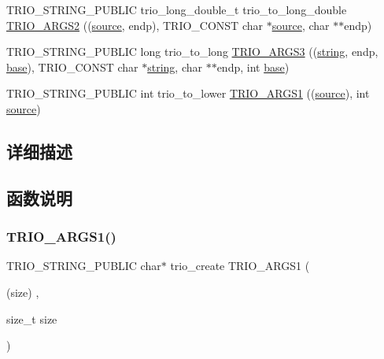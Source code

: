 \begin{DoxyCompactItemize}
\item 
T\+R\+I\+O\+\_\+\+S\+T\+R\+I\+N\+G\+\_\+\+P\+U\+B\+L\+IC trio\+\_\+long\+\_\+double\+\_\+t trio\+\_\+to\+\_\+long\+\_\+double \hyperlink{group___static_strings_gaed92d5fa148b528a8b3c0e37c7b8a64f}{T\+R\+I\+O\+\_\+\+A\+R\+G\+S2} ((\hyperlink{structsource}{source}, endp), T\+R\+I\+O\+\_\+\+C\+O\+N\+ST char $\ast$\hyperlink{structsource}{source}, char $\ast$$\ast$endp)
\item 
T\+R\+I\+O\+\_\+\+S\+T\+R\+I\+N\+G\+\_\+\+P\+U\+B\+L\+IC long trio\+\_\+to\+\_\+long \hyperlink{group___static_strings_ga864214bc85a084895ab27ef877035b84}{T\+R\+I\+O\+\_\+\+A\+R\+G\+S3} ((\hyperlink{structstring}{string}, endp, \hyperlink{structbase}{base}), T\+R\+I\+O\+\_\+\+C\+O\+N\+ST char $\ast$\hyperlink{structstring}{string}, char $\ast$$\ast$endp, int \hyperlink{structbase}{base})
\item 
T\+R\+I\+O\+\_\+\+S\+T\+R\+I\+N\+G\+\_\+\+P\+U\+B\+L\+IC int trio\+\_\+to\+\_\+lower \hyperlink{group___static_strings_ga8a0423dd551b1dd36ef8ebd78b264d7e}{T\+R\+I\+O\+\_\+\+A\+R\+G\+S1} ((\hyperlink{structsource}{source}), int \hyperlink{structsource}{source})
\end{DoxyCompactItemize}


\subsection{详细描述}


\subsection{函数说明}
\mbox{\label{group___static_strings_ga8ce1b8461e39195df0f8a0fac057c615}} 
\subsubsection{\texorpdfstring{T\+R\+I\+O\+\_\+\+A\+R\+G\+S1()}{TRIO\_ARGS1()}\hspace{0.1cm}{\footnotesize\ttfamily [1/7]}}
{\footnotesize\ttfamily T\+R\+I\+O\+\_\+\+S\+T\+R\+I\+N\+G\+\_\+\+P\+U\+B\+L\+IC char$\ast$ trio\+\_\+create T\+R\+I\+O\+\_\+\+A\+R\+G\+S1 (\begin{DoxyParamCaption}\item[{(size)}]{,  }\item[{size\+\_\+t}]{size }\end{DoxyParamCaption})}

